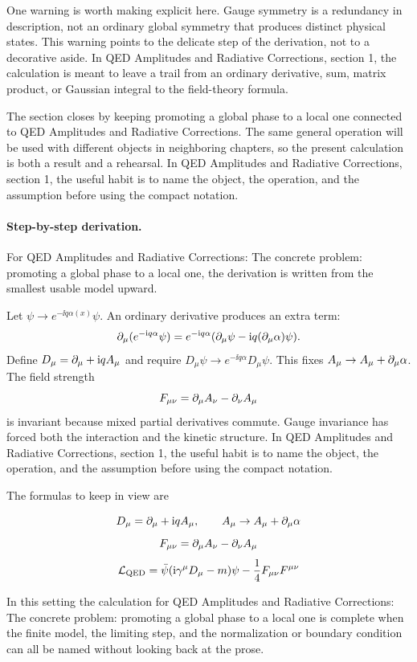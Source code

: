 One warning is worth making explicit here.  Gauge symmetry is a redundancy in description, not an ordinary global symmetry that produces distinct physical states.  This warning points to the delicate step of the derivation, not to a decorative aside.  In QED Amplitudes and Radiative Corrections, section 1, the calculation is meant to leave a trail from an ordinary derivative, sum, matrix product, or Gaussian integral to the field-theory formula.

The section closes by keeping promoting a global phase to a local one connected to QED Amplitudes and Radiative Corrections.  The same general operation will be used with different objects in neighboring chapters, so the present calculation is both a result and a rehearsal.  In QED Amplitudes and Radiative Corrections, section 1, the useful habit is to name the object, the operation, and the assumption before using the compact notation.



\paragraph{Step-by-step derivation.}

For QED Amplitudes and Radiative Corrections: The concrete problem: promoting a global phase to a local one, the derivation is written from the smallest usable model upward.

Let \(\psi\to e^{-\ii q\alpha(x)}\psi\).  An ordinary derivative produces an extra term:
\[
  \partial_\mu(e^{-\mathrm i q\alpha}\psi)
  =
  e^{-\mathrm i q\alpha}(\partial_\mu\psi-\mathrm i q(\partial_\mu\alpha)\psi).
\]
Define \(D_\mu=\partial_\mu+\mathrm i qA_\mu\) and require \(D_\mu\psi\to e^{-\ii q\alpha}D_\mu\psi\).  This fixes \(A_\mu\to A_\mu+\partial_\mu\alpha\).  The field strength
\[
  F_{\mu\nu}=\partial_\mu A_\nu-\partial_\nu A_\mu
\]
is invariant because mixed partial derivatives commute.  Gauge invariance has forced both the interaction and the kinetic structure.  In QED Amplitudes and Radiative Corrections, section 1, the useful habit is to name the object, the operation, and the assumption before using the compact notation.

The formulas to keep in view are

\[
  D_\mu=\partial_\mu+\mathrm i qA_\mu,\qquad A_\mu\to A_\mu+\partial_\mu\alpha
\]
\[
  F_{\mu\nu}=\partial_\mu A_\nu-\partial_\nu A_\mu
\]
\[
  \mathcal L_{\mathrm{QED}}=\bar\psi(\mathrm i\gamma^\mu D_\mu-m)\psi-\frac14F_{\mu\nu}F^{\mu\nu}
\]

In this setting the calculation for QED Amplitudes and Radiative Corrections: The concrete problem: promoting a global phase to a local one is complete when the finite model, the limiting step, and the normalization or boundary condition can all be named without looking back at the prose.




